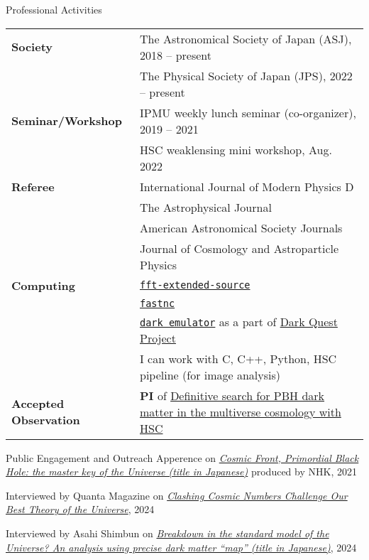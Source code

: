 \begin{rSection}{Professional Activities}
    \begin{tabular}{ @{} >{\bfseries}l @{\hspace{6ex}} p{}}
    Society              & The Astronomical Society of Japan (ASJ), 2018 -- present \\
                         & The Physical Society of Japan (JPS), 2022 -- present  \\
    Seminar/Workshop     & IPMU weekly lunch seminar (co-organizer), 2019 -- 2021 \\
                         & HSC weaklensing mini workshop, Aug. 2022  \\
    Referee              & International Journal of Modern Physics D \\
                         & The Astrophysical Journal \\
                         & American Astronomical Society Journals \\
                         & Journal of Cosmology and Astroparticle Physics \\
    Computing            & \href{https://github.com/git-sunao/fft-extended-source}{\tt fft-extended-source} \\
                         & \href{https://github.com/git-sunao/fastnc}{\tt fastnc} \\
                         & \href{https://dark-emulator.readthedocs.io/en/latest/}{\tt dark emulator} as a part of \href{https://darkquestcosmology.github.io}{Dark Quest Project} \\
                         & I can work with C, C++, Python, HSC pipeline (for image analysis) \\
    Accepted Observation & {\textbf{PI}} of \href{https://subarutelescope.org/Observing/Schedule/S20B_abstract/S20B0032abst.html}{Definitive search for PBH dark matter in the multiverse cosmology with HSC}
    \end{tabular}
\end{rSection}

\begin{rSection}{Public Engagement and Outreach}
  Apperence on \href{https://www.nhk-ondemand.jp/goods/G2021114366SA000/}{\textit{Cosmic Front, Primordial Black Hole: the master key of the Universe (title in Japanese)}} produced by NHK, 2021

  Interviewed by Quanta Magazine on \href{https://www.quantamagazine.org/clashing-cosmic-numbers-challenge-our-best-theory-of-the-universe-20240119/}{\textit{Clashing Cosmic Numbers Challenge Our Best Theory of the Universe}}, 2024
  
  Interviewed by Asahi Shimbun on \href{https://www.asahi.com/articles/ASR4H415RR48ULBH001.html}{\textit{Breakdown in the standard model of the Universe? An analysis using precise dark matter ``map'' (title in Japanese)}}, 2024
\end{rSection}
